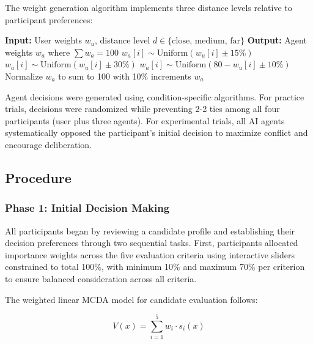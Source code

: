 \documentclass[conference]{IEEEtran}
\begin{document}
The weight generation algorithm implements three distance levels relative to participant preferences:

\begin{algorithm}
\caption{AI Agent Weight Generation}
\begin{algorithmic}
\STATE \textbf{Input:} User weights $w_u$, distance level $d \in \{\text{close, medium, far}\}$
\STATE \textbf{Output:} Agent weights $w_a$ where $\sum w_a = 100$
\STATE 
{}
        \STATE $w_a[i] \sim \text{Uniform}(w_u[i] \pm 15\%)$
    \ENDFOR
{}
        \STATE $w_a[i] \sim \text{Uniform}(w_u[i] \pm 30\%)$
    \ENDFOR
{}
        \STATE $w_a[i] \sim \text{Uniform}(80 - w_u[i] \pm 10\%)$ 
    \ENDFOR
\ENDIF
\STATE 
\STATE Normalize $w_a$ to sum to 100 with 10\% increments
\RETURN $w_a$
\end{algorithmic}
\end{algorithm}

Agent decisions were generated using condition-specific algorithms. For practice trials, decisions were randomized while preventing 2-2 ties among all four participants (user plus three agents). For experimental trials, all AI agents systematically opposed the participant's initial decision to maximize conflict and encourage deliberation.

\subsection{Procedure}

\subsubsection{Phase 1: Initial Decision Making}

All participants began by reviewing a candidate profile and establishing their decision preferences through two sequential tasks. First, participants allocated importance weights across the five evaluation criteria using interactive sliders constrained to total 100\%, with minimum 10\% and maximum 70\% per criterion to ensure balanced consideration across all criteria.

The weighted linear MCDA model for candidate evaluation follows:

\begin{equation}
V(x) = \sum_{i=1}^{5} w_i \cdot s_i(x)
\end{equation}
\end{document}
